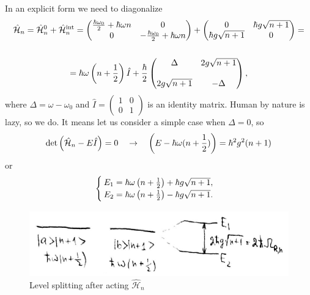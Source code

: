 In an explicit form we need to diagonalize
\begin{multline}
	\hat{\mathcal{H}}_n = \hat{\mathcal{H}}^0_{n} + \hat{\mathcal{H}}^{\text{int}}_n = 
	\begin{pmatrix}
		\frac{\hbar \omega_0}{2} + \hbar \omega n & 0 \\
		0 & - \frac{\hbar \omega_0}{2} + \hbar \omega n
	\end{pmatrix} +
	\begin{pmatrix}
		0 & \hbar g \sqrt{n+1} \\
		\hbar g \sqrt{n+1} & 0
	\end{pmatrix} = \\ \\ =
	\hbar \omega \left( n+ \frac{1}{2} \right) \hat{I}
	+ \frac{\hbar}{2} \begin{pmatrix}
		\Delta & 2g \sqrt{n+1} \\ \\
		2g \sqrt{n+1} & - \Delta
	\end{pmatrix},
\end{multline}
where $\Delta = \omega - \omega_0$ and $\hat{I} = \begin{pmatrix}
1 & 0 \\
0 & 1
\end{pmatrix}$ is an identity matrix. Human by nature is lazy, so we do. It means let us consider a simple case when $\Delta = 0$, so
\begin{equation}
	\det \left( \hat{\mathcal{H}}_n - E \hat{I} \right) = 0 \quad \to \quad \left( E - \hbar \omega (n + \frac{1}{2}) \right) = \hbar^2 g^2 (n+1)
\end{equation} 
or
\begin{equation}
	\begin{cases}
		E_1 = \hbar \omega \left( n + \frac{1}{2} \right) + \hbar g \sqrt{n+1}, \\
		E_2 = \hbar \omega \left( n + \frac{1}{2} \right) - \hbar g \sqrt{n+1}.
	\end{cases}
\end{equation}
\begin{figure}
	\centering
	\includegraphics[width=0.7\linewidth]{fig/L6/leveeeelllls}
	\caption{Level splitting after acting $\hat{\mathcal{H}}_n$}
	\label{fig:leveeeelllls}
\end{figure}
